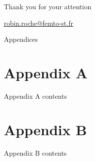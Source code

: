 \documentclass[9pt,handout]{beamer} %
\begin{document}


\begin{frame}[plain]

\begin{center}
\Huge Thank you for your attention

\vspace*{1em}
\normalsize \url{robin.roche@femto-st.fr}

\end{center}

\end{frame}


\appendix\addtocounter{part}{-1}



\begin{frame}[plain]

\vspace*{1.5em}
\begin{center}
\Huge Appendices
\end{center}

\end{frame}



\section{Appendix A}


\begin{frame}{Appendix A contents}

\lipsum[1-1]

\end{frame}


\section{Appendix B}


\begin{frame}{Appendix B contents}

\lipsum[1-1]

\end{frame}

\end{document}
